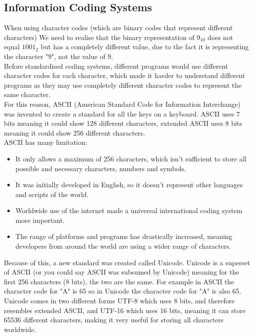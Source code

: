 \subsection{Information Coding Systems}
  \noindent
  When using character codes (which are binary codes that represent different characters) We need to realise that the binary representation of $9_{10}$ does not equal $1001_2$ but has a completely different value, due to the fact it is representing the character "9", not the value of 9. \\
  Before standardised coding systems, different programs would use different character codes for each character, which made it harder to understand different programs as they may use completely different character codes to represent the same character.\\
  For this reason, ASCII (American Standard Code for Information Interchange) was invented to create a standard for all the keys on a keyboard. ASCII uses 7 bits meaning it could show 128 different characters, extended ASCII uses 8 bits meaning it could show 256 different characters.\\
  ASCII has many limitation:
  \begin{itemize}
    \setlength{\itemsep}{0em}
    \item It only allows a maximum of 256 characters, which isn't sufficient to store all possible and necessary characters, numbers and symbols.
    \item It was initially developed in English, so it doesn't represent other languages and scripts of the world.
    \item Worldwide use of the internet made a universal international coding system more important.
    \item The range of platforms and programs has drastically increased, meaning developers from around the world are using a wider range of characters.
  \end{itemize}
  Because of this, a new standard was created called Unicode. Unicode is a superset of ASCII (or you could say ASCII was subsumed by Unicode) meaning for the first 256 characters (8 bits), the two are the same. For example in ASCII the character code for "A" is 65 so in Unicode the character code for "A" is also 65. Unicode comes in two different forms UTF-8 which uses 8 bits, and therefore resembles extended ASCII, and UTF-16 which uses 16 bits, meaning it can store 65536 different characters, making it very useful for storing all characters worldwide.\\
